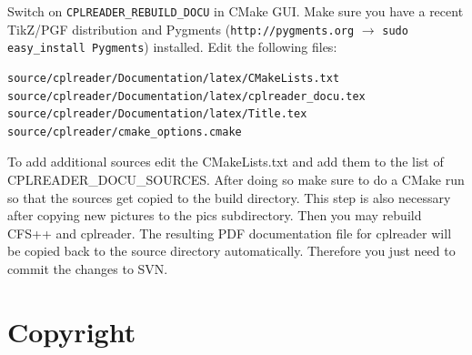 \documentclass[a4paper,10pt]{article}
\begin{document}
Switch on  {\tt CPLREADER\_REBUILD\_DOCU} in CMake  GUI. Make sure  you have a
recent   TikZ/PGF  distribution   and   Pygments  ({\tt   http://pygments.org}
$\rightarrow$ {\tt sudo easy\_install  Pygments}) installed. Edit the following
files:
\begin{verbatim}
source/cplreader/Documentation/latex/CMakeLists.txt
source/cplreader/Documentation/latex/cplreader_docu.tex
source/cplreader/Documentation/latex/Title.tex
source/cplreader/cmake_options.cmake
\end{verbatim}
To add additional sources edit the  CMakeLists.txt and add them to the list of
CPLREADER\_DOCU\_SOURCES. After doing  so make sure to do a  CMake run so that
the sources  get copied to  the build directory.  This step is  also necessary
after  copying new pictures  to the  pics subdirectory.  Then you  may rebuild
CFS++ and cplreader.  The resulting PDF documentation file  for cplreader will
be copied back to the  source directory automatically. Therefore you just need
to commit the changes to SVN.


\newpage
\section{Copyright}
 
\end{document}
